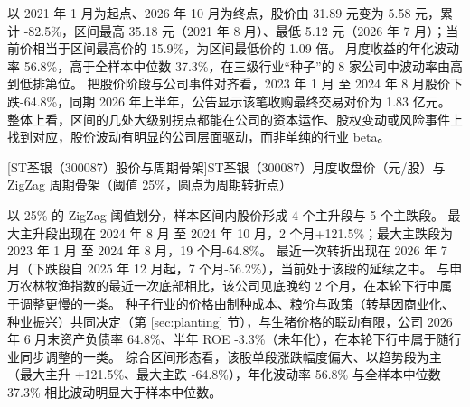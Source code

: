  以 2021 年 1 月为起点、2026 年 10 月为终点，股价由 31.89 元变为 5.58 元，累计 -82.5\%，区间最高 35.18 元（2021 年 8 月）、最低 5.12 元（2026 年 7 月）；当前价相当于区间最高价的 15.9\%，为区间最低价的 1.09 倍。 月度收益的年化波动率 56.8\%，高于全样本中位数 37.3\%，在三级行业“种子”的 8 家公司中波动率由高到低排第位。 把股价阶段与公司事件对齐看，2023 年 1 月 至 2024 年 8 月股价下跌-64.8\%，同期 2026 年上半年，公告显示该笔收购最终交易对价为 1.83 亿元。 整体上看，区间的几处大级别拐点都能在公司的资本运作、股权变动或风险事件上找到对应，股价波动有明显的公司层面驱动，而非单纯的行业 beta。

\begin{center}
\begin{minipage}{\textwidth}\centering
{}

[ST荃银（300087）股价与周期骨架]{ST荃银（300087）月度收盘价（元/股）与 ZigZag 周期骨架（阈值 25\%，圆点为周期转折点）}
\end{minipage}
\end{center}

 以 25\% 的 ZigZag 阈值划分，样本区间内股价形成 4 个主升段与 5 个主跌段。 最大主升段出现在 2024 年 8 月 至 2024 年 10 月，2 个月+121.5\%；最大主跌段为 2023 年 1 月 至 2024 年 8 月，19 个月-64.8\%。 最近一次转折出现在 2026 年 7 月（下跌段自 2025 年 12 月起，7 个月-56.2\%），当前处于该段的延续之中。 与申万农林牧渔指数的最近一次底部相比，该公司见底晚约 2 个月，在本轮下行中属于调整更慢的一类。 种子行业的价格由制种成本、粮价与政策（转基因商业化、种业振兴）共同决定（第 \ref{sec:planting} 节），与生猪价格的联动有限，公司 2026 年 6 月末资产负债率 64.8\%、半年 ROE -3.3\%（未年化），在本轮下行中属于随行业同步调整的一类。 综合区间形态看，该股单段涨跌幅度偏大、以趋势段为主（最大主升 +121.5\%、最大主跌 -64.8\%），年化波动率 56.8\% 与全样本中位数 37.3\% 相比波动明显大于样本中位数。

